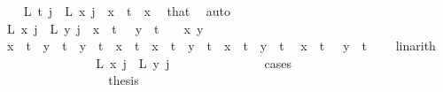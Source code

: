 \begin{isabellebody}
\ \isamarkupfalse%
\ {\isacharasterisk}{\kern0pt}{\isacharasterisk}{\kern0pt}{\isacharcolon}{\kern0pt}\ {\isachardoublequoteopen}L{\isacharprime}{\kern0pt}\ t\ j\ {\isacharequal}{\kern0pt}\ L{\isacharprime}{\kern0pt}\ x\ j{\isachardoublequoteclose}\ \ {\isachardoublequoteopen}x\ {\isacharless}{\kern0pt}\ t{\isachardoublequoteclose}\ \ x\ \isamarkupfalse%
\ that\ \isamarkupfalse%
\ auto\isanewline
\ \ \ \ \ \ \ \ \ \ \isamarkupfalse%
\ {\isachardoublequoteopen}L{\isacharprime}{\kern0pt}\ x\ j\ {\isacharequal}{\kern0pt}\ L{\isacharprime}{\kern0pt}\ y\ j{\isachardoublequoteclose}\ \ {\isachardoublequoteopen}x\ {\isacharless}{\kern0pt}\ t\ {\isacharplus}{\kern0pt}\ {}{\isachardoublequoteclose}\ {\isachardoublequoteopen}y\ {\isacharless}{\kern0pt}\ t\ {\isacharplus}{\kern0pt}\ {}{\isachardoublequoteclose}\ \ x\ y\ \isanewline
\ \ \ \ \ \ \ \ \ \ \isamarkupfalse%
{\isacharminus}{\kern0pt}\isanewline
\ \ \ \ \ \ \ \ \ \ \ \ \isamarkupfalse%
\ {\isachardoublequoteopen}x\ {\isacharless}{\kern0pt}\ t\ {\isasymand}\ y\ {\isacharequal}{\kern0pt}\ t{\isachardoublequoteclose}\ {\isacharbar}{\kern0pt}\ {\isachardoublequoteopen}y\ {\isacharless}{\kern0pt}\ t\ {\isasymand}\ x\ {\isacharequal}{\kern0pt}\ t{\isachardoublequoteclose}\ {\isacharbar}{\kern0pt}\ {\isachardoublequoteopen}x\ {\isacharequal}{\kern0pt}\ t\ {\isasymand}\ y\ {\isacharequal}{\kern0pt}\ t{\isachardoublequoteclose}\ {\isacharbar}{\kern0pt}\ {\isachardoublequoteopen}x\ {\isacharless}{\kern0pt}\ t\ {\isasymand}\ y\ {\isacharless}{\kern0pt}\ t{\isachardoublequoteclose}\ \isamarkupfalse%
\ {\isacartoucheopen}x\ {\isacharless}{\kern0pt}\ t\ {\isacharplus}{\kern0pt}\ {}{\isacartoucheclose}\ {\isacartoucheopen}y\ {\isacharless}{\kern0pt}\ t\ {\isacharplus}{\kern0pt}\ {}{\isacartoucheclose}\ \isamarkupfalse%
\ linarith\isanewline
\ \ \ \ \ \ \ \ \ \ \ \ \isamarkupfalse%
\ \isamarkupfalse%
\ {\isachardoublequoteopen}L{\isacharprime}{\kern0pt}\ x\ j\ {\isacharequal}{\kern0pt}\ L{\isacharprime}{\kern0pt}\ y\ j{\isachardoublequoteclose}\ \isanewline
\ \ \ \ \ \ \ \ \ \ \ \ \isamarkupfalse%
\ cases\isanewline
\ \ \ \ \ \ \ \ \ \ \ \ \ \ \isamarkupfalse%
\ {}\isanewline
\ \ \ \ \ \ \ \ \ \ \ \ \ \ \isamarkupfalse%
\ \isamarkupfalse%
\ {\isacharquery}{\kern0pt}thesis\ \isamarkupfalse%

\end{isabellebody}

